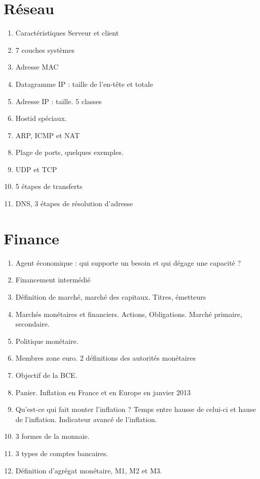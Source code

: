 \documentclass[11pt, twocolumn, landscape]{article}
\begin{document}
\part{Réseau}
\begin{enumerate}
	\item Caractéristiques Serveur et client
	\item 7 couches systèmes
	\item Adresse MAC
	\item Datagramme IP : taille de l'en-tête et totale
	\item Adresse IP : taille. 5 classes
	\item Hostid spéciaux.
	\item ARP, ICMP et NAT
	\item Plage de ports, quelques exemples. 
	\item UDP et TCP
	\item 5 étapes de transferts
	\item DNS, 3 étapes de résolution d'adresse
\end{enumerate}

\part{Finance}
\begin{enumerate}
\item Agent économique : qui supporte un besoin et qui dégage une capacité ?
\item Financement intermédié
\item Définition de marché, marché des capitaux. Titres, émetteurs
\item Marchés monétaires et financiers. Actions, Obligations. Marché primaire, secondaire.
\item Politique monétaire. 
\item Membres zone euro. 2 définitions des autorités monétaires
\item Objectif de la BCE.
\item Panier. Inflation en France et en Europe en janvier 2013
\item Qu'est-ce qui fait monter l'inflation ? Temps entre hausse de celui-ci et hause de l'inflation. Indicateur avancé de l'inflation.
\item 3 formes de la monnaie. 
\item 3 types de comptes bancaires. 
\item Définition d'agrégat monétaire, M1, M2 et M3. 
\end{enumerate}
\end{document}
